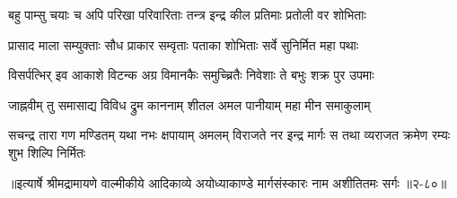 \twolineshloka
{बहु पाम्सु चयाः च अपि परिखा परिवारिताः}
{तन्त्र इन्द्र कील प्रतिमाः प्रतोली वर शोभिताः} %

\twolineshloka
{प्रासाद माला सम्युक्ताः सौध प्राकार सम्वृताः}
{पताका शोभिताः सर्वे सुनिर्मित महा पथाः} %

\twolineshloka
{विसर्पत्भिर् इव आकाशे विटन्क अग्र विमानकैः}
{समुच्च्रितैः निवेशाः ते बभुः शक्र पुर उपमाः} %

\twolineshloka
{जाह्नवीम् तु समासाद्य विविध द्रुम काननाम्}
{शीतल अमल पानीयाम् महा मीन समाकुलाम्} %

\fourlineindentedshloka
{सचन्द्र तारा गण मण्डितम् यथा}
{नभः क्षपायाम् अमलम् विराजते}
{नर इन्द्र मार्गः स तथा व्यराजत}
{क्रमेण रम्यः शुभ शिल्पि निर्मितः} %


॥इत्यार्षे श्रीमद्रामायणे वाल्मीकीये आदिकाव्ये अयोध्याकाण्डे मार्गसंस्कारः नाम अशीतितमः सर्गः ॥२-८०॥
